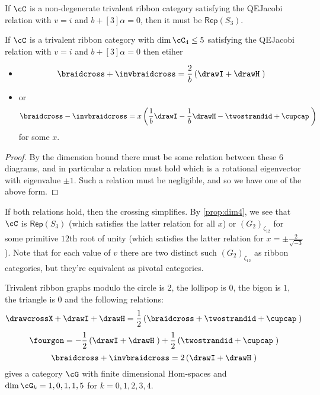 \documentclass[12pt]{amsart}
\begin{document}
\begin{corollary}
If $\cC$ is a non-degenerate trivalent ribbon category satisfying the QEJacobi relation with $v=i$ and $b+[3]\alpha = 0$, then it must be $\mathsf{Rep}(S_3)$.
\end{corollary}

\begin{corollary}
If $\cC$ is a trivalent ribbon category with $\dim \cC_4 \leq 5$ satisfying the QEJacobi relation with $v=i$ and $b+[3]\alpha = 0$ then etiher
\begin{itemize}
\item $$\braidcross + \invbraidcross = \frac{2}{b} \left(\drawI + \drawH \;\right)$$ 
\item or $$\braidcross - \invbraidcross = x \left(\frac{1}{b} \drawI - \frac{1}{b} \drawH - \twostrandid + \cupcap\;\right)$$ for some $x$.
\end{itemize}
\end{corollary}
\begin{proof}
By the dimension bound there must be some relation between these $6$ diagrams, and in particular a relation must hold which is a rotational eigenvector with eigenvalue $\pm 1$.  Such a relation must be negligible, and so we have one of the above form.
\end{proof}

If both relations hold, then the crossing simplifies.  By \ref{prop:dim4}, we
see that $\cC$ is $\mathsf{Rep}(S_3)$ (which satisfies the latter relation for
all $x$) or $(G_2)_{\zeta_{12}}$ for some primitive $12$th root of unity
(which satisfies the latter relation for $x = \pm \frac{2}{\sqrt{-3}}$). Note
that for each value of $v$ there are two distinct such $(G_2)_{\zeta_{12}}$ as
ribbon categories, but they're equivalent as pivotal categories.

\begin{conjecture}
Trivalent ribbon graphs modulo the circle is $2$, the lollipop is $0$, the bigon is $1$, the triangle is $0$ and the following relations:
$$\drawcrossX + \drawI + \drawH = \frac{1}{2} \left(\braidcross + \twostrandid + \cupcap \;\right)$$
$$\fourgon = -\frac{1}{2} \left(\drawI + \drawH \;\right) + \frac{1}{2} \left(\twostrandid + \cupcap\;\right)$$
$$\braidcross + \invbraidcross = 2 \left(\drawI + \drawH \;\right)$$
gives a category $\cG$ with finite dimensional Hom-spaces and $\dim \cG_k = 1,0,1,1,5$ for $k = 0,1,2,3,4$.  
\end{conjecture}
\end{document}
